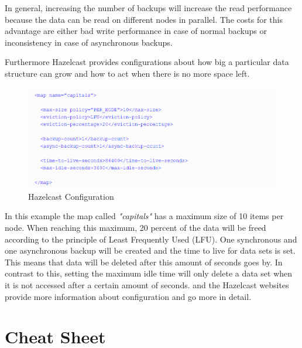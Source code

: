 In general, increasing the number of backups will increase the read performance because the data can be read on different nodes in parallel. The costs for this advantage are either bad write performance in case of normal backups or inconsistency in case of asynchronous backups.

Furthermore Hazelcast provides configurations about how big a particular data structure can grow and how to act when there is no more space left. 
\begin{flushleft}
\begin{figure}[h]
    \includegraphics{img/hazelcastXML.PNG}
    \caption{Hazelcast Configuration \parencite{johns2015}}
\end{figure}
\end{flushleft}
In this example the map called \textit{"capitals"} has a maximum size of 10 items per node. When reaching this maximum, 20 percent of the data will be freed according to the principle of Least Frequently Used (LFU). One synchronous and one asynchronous backup will be created and the time to live for data sets is set. This means that data will be deleted after this amount of seconds goes by. In contrast to this, setting the maximum idle time will only delete a data set when it is not accessed after a certain amount of seconds.
\citeauthor{johns2015} and the Hazelcast websites provide more information about configuration and go more in detail.

\section{Cheat Sheet}
